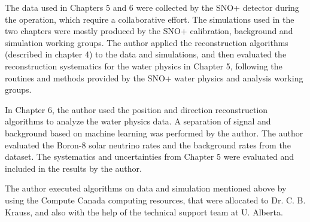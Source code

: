 The data used in Chapters 5 and 6 were collected by the SNO+ detector during the operation, which require a collaborative effort. The simulations used in the two chapters were mostly produced by the SNO+ calibration, background and simulation working groups. The author applied the reconstruction algorithms (described in chapter 4) to the data and simulations, and then evaluated the reconstruction systematics for the water physics in Chapter 5, following the routines and methods provided by the SNO+ water physics and analysis working groups.

In Chapter 6, the author used the position and direction reconstruction algorithms to analyze the water physics data. A separation of signal and background based on machine learning was performed by the author. The author evaluated the Boron-8 solar neutrino rates and the background rates from the dataset. The systematics and uncertainties from Chapter 5 were evaluated and included in the results by the author.

The author executed algorithms on data and simulation mentioned above by using the Compute Canada computing resources, that were allocated to Dr. C. B. Krauss, and also with the help of the technical support team at U. Alberta.